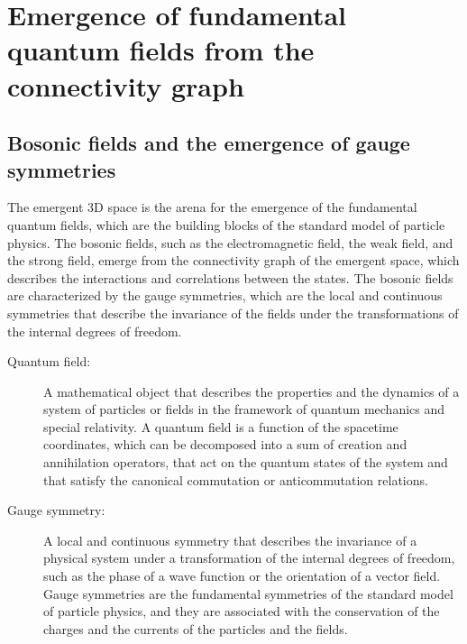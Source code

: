 
\section{Emergence of fundamental quantum fields from the connectivity graph}
\subsection{Bosonic fields and the emergence of gauge symmetries}
The emergent 3D space is the arena for the emergence of the fundamental quantum fields, which are the building blocks of the standard model of particle physics. The bosonic fields, such as the electromagnetic field, the weak field, and the strong field, emerge from the connectivity graph of the emergent space, which describes the interactions and correlations between the states. The bosonic fields are characterized by the gauge symmetries, which are the local and continuous symmetries that describe the invariance of the fields under the transformations of the internal degrees of freedom.

\begin{tcolorbox}[colback=blue!5!white,colframe=blue!75!black,title=New terms]
\begin{description}
\item[Quantum field:] A mathematical object that describes the properties and the dynamics of a system of particles or fields in the framework of quantum mechanics and special relativity. A quantum field is a function of the spacetime coordinates, which can be decomposed into a sum of creation and annihilation operators, that act on the quantum states of the system and that satisfy the canonical commutation or anticommutation relations.
\item[Gauge symmetry:] A local and continuous symmetry that describes the invariance of a physical system under a transformation of the internal degrees of freedom, such as the phase of a wave function or the orientation of a vector field. Gauge symmetries are the fundamental symmetries of the standard model of particle physics, and they are associated with the conservation of the charges and the currents of the particles and the fields.
\end{description}
\end{tcolorbox}


